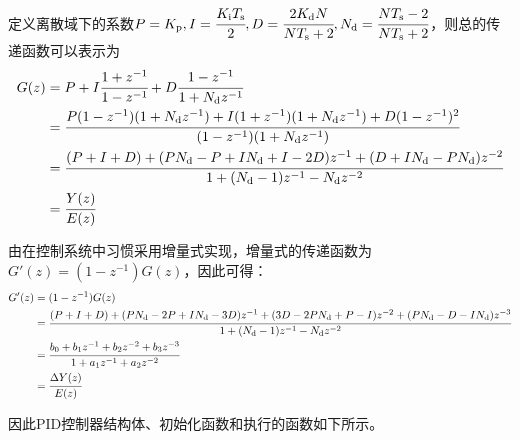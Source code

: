 定义离散域下的系数\(P=K_{\mathrm{p}},I=\cfrac{K_{\mathrm{i}}T_{\mathrm{s}}}{2},D=\cfrac{2K_{\mathrm{d}}N}{NT_{\mathrm{s}}+2},N_{\mathrm{d}}=\cfrac{NT_{\mathrm{s}}-2}{NT_{\mathrm{s}}+2}\)，则总的传递函数可以表示为
\begin{align*}
    G(z)&=P+I\cfrac{1+z^{-1}}{1-z^{-1}}+D\cfrac{1-z^{-1}}{1+N_{\mathrm{d}}z^{-1}}\\
    & = \cfrac{P(1-z^{-1})(1+N_{\mathrm{d}}z^{-1})+
    I(1+z^{-1})(1+N_{\mathrm{d}}z^{-1})+
    D(1-z^{-1})^2}{(1-z^{-1})(1+N_{\mathrm{d}}z^{-1})}\\
    & =\cfrac{(P+I+D)+(PN_{\mathrm{d}}-P+IN_{\mathrm{d}}+I-2D)z^{-1}+(D+IN_{\mathrm{d}}-PN_{\mathrm{d}})z^{-2}}{1+(N_{\mathrm{d}}-1)z^{-1}-N_{\mathrm{d}}z^{-2}}\\
    & = \cfrac{Y(z)}{E(z)}
\end{align*}

由在控制系统中习惯采用增量式实现，增量式的传递函数为\(G'(z)=(1-z^{-1})G(z)\)，因此可得：
\begin{align*}
    G'(z)&=(1-z^{-1})G(z)\\
    & = \cfrac{(P+I+D)+(PN_{\mathrm{d}}-2P+IN_{\mathrm{d}}-3D)z^{-1}+(3D-2PN_{\mathrm{d}}+P-I)z^{-2}+(PN_{\mathrm{d}}-D-IN_{\mathrm{d}})z^{-3}}{1+(N_{\mathrm{d}}-1)z^{-1}-N_{\mathrm{d}}z^{-2}}\\
    & = \cfrac{b_{0}+b_{1}z^{-1}+b_{2}z^{-2}+b_{3}z^{-3}}{1+a_{1}z^{-1}+a_{2}z^{-2}}\\
    & = \cfrac{\Delta Y(z)}{E(z)}
\end{align*}

因此PID控制器结构体、初始化函数和执行的函数如下所示。

